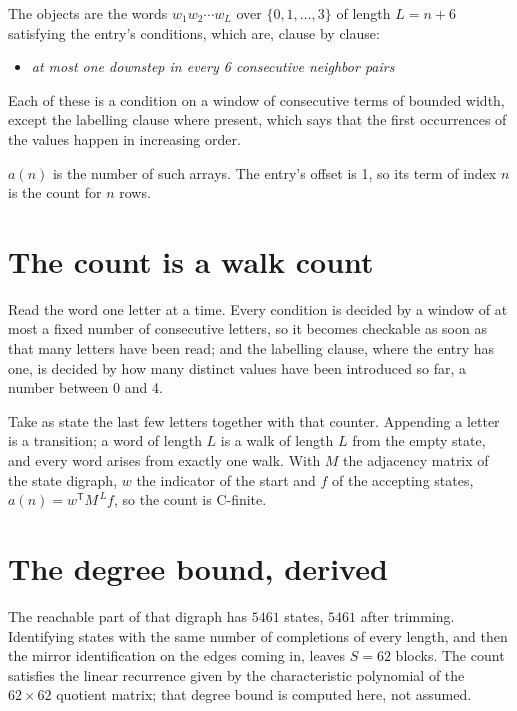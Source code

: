 \documentclass[11pt]{article}
\theoremstyle{definition}
\begin{document}
The objects are the words $w_1 w_2 \cdots w_L$ over $\{0,1,\dots,3\}$ of length $L = n + 6$ satisfying the entry's conditions, which are, clause by clause:

\begin{itemize}

\item {\itshape at most one downstep in every 6 consecutive neighbor pairs}

\end{itemize}

Each of these is a condition on a window of consecutive terms of bounded width, except the labelling clause where present, which says that the first occurrences of the values happen in increasing order.

$a(n)$ is the number of such arrays. The entry's offset is 1, so its term of index $n$ is the count for $n$ rows.

\section{The count is a walk count}

Read the word one letter at a time. Every condition is decided by a window of at most a fixed number of consecutive letters, so it becomes checkable as soon as that many letters have been read; and the labelling clause, where the entry has one, is decided by how many distinct values have been introduced so far, a number between $0$ and 4.

Take as state the last few letters together with that counter. Appending a letter is a transition; a word of length $L$ is a walk of length $L$ from the empty state, and every word arises from exactly one walk. With $M$ the adjacency matrix of the state digraph, $w$ the indicator of the start and $f$ of the accepting states, $a(n) = w^{\mathsf T}M^{\,L}f$, so the count is C-finite.

\section{The degree bound, derived}

The reachable part of that digraph has $5461$ states, $5461$ after trimming. Identifying states with the same number of completions of every length, and then the mirror identification on the edges coming in, leaves $S = 62$ blocks. The count satisfies the linear recurrence given by the characteristic polynomial of the $62\times62$ quotient matrix; that degree bound is computed here, not assumed.
\end{document}
